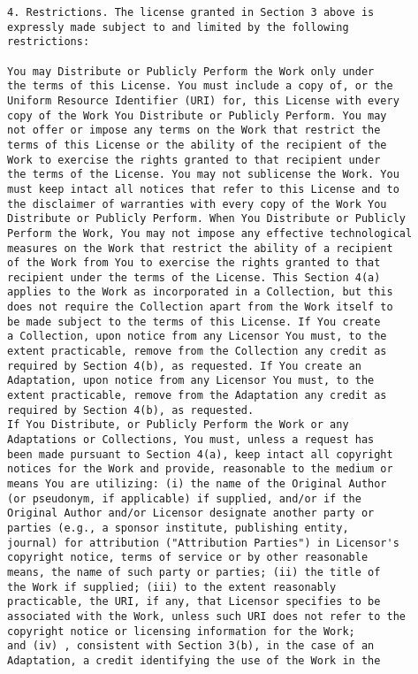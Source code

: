 \begin{verbatim}
4. Restrictions. The license granted in Section 3 above is
expressly made subject to and limited by the following
restrictions:

You may Distribute or Publicly Perform the Work only under
the terms of this License. You must include a copy of, or the
Uniform Resource Identifier (URI) for, this License with every
copy of the Work You Distribute or Publicly Perform. You may
not offer or impose any terms on the Work that restrict the
terms of this License or the ability of the recipient of the
Work to exercise the rights granted to that recipient under
the terms of the License. You may not sublicense the Work. You
must keep intact all notices that refer to this License and to
the disclaimer of warranties with every copy of the Work You
Distribute or Publicly Perform. When You Distribute or Publicly
Perform the Work, You may not impose any effective technological
measures on the Work that restrict the ability of a recipient
of the Work from You to exercise the rights granted to that
recipient under the terms of the License. This Section 4(a)
applies to the Work as incorporated in a Collection, but this
does not require the Collection apart from the Work itself to
be made subject to the terms of this License. If You create
a Collection, upon notice from any Licensor You must, to the
extent practicable, remove from the Collection any credit as
required by Section 4(b), as requested. If You create an
Adaptation, upon notice from any Licensor You must, to the
extent practicable, remove from the Adaptation any credit as
required by Section 4(b), as requested.
If You Distribute, or Publicly Perform the Work or any
Adaptations or Collections, You must, unless a request has
been made pursuant to Section 4(a), keep intact all copyright
notices for the Work and provide, reasonable to the medium or
means You are utilizing: (i) the name of the Original Author
(or pseudonym, if applicable) if supplied, and/or if the
Original Author and/or Licensor designate another party or
parties (e.g., a sponsor institute, publishing entity,
journal) for attribution ("Attribution Parties") in Licensor's
copyright notice, terms of service or by other reasonable
means, the name of such party or parties; (ii) the title of
the Work if supplied; (iii) to the extent reasonably
practicable, the URI, if any, that Licensor specifies to be
associated with the Work, unless such URI does not refer to the
copyright notice or licensing information for the Work;
and (iv) , consistent with Section 3(b), in the case of an
Adaptation, a credit identifying the use of the Work in the

\end{verbatim}
